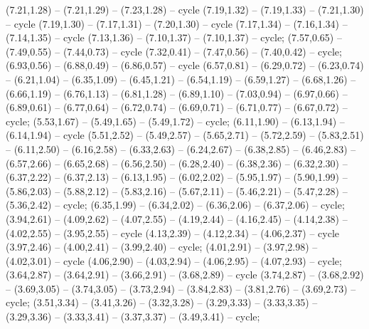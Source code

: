 { (7.21,1.28) -- (7.21,1.29) -- (7.23,1.28) -- cycle (7.19,1.32) -- (7.19,1.33) -- (7.21,1.30) -- cycle (7.19,1.30) -- (7.17,1.31) -- (7.20,1.30) -- cycle (7.17,1.34) -- (7.16,1.34) -- (7.14,1.35) -- cycle (7.13,1.36) -- (7.10,1.37) -- (7.10,1.37) -- cycle;
 (7.57,0.65) -- (7.49,0.55) -- (7.44,0.73) -- cycle (7.32,0.41) -- (7.47,0.56) -- (7.40,0.42) -- cycle;
 (6.93,0.56) -- (6.88,0.49) -- (6.86,0.57) -- cycle (6.57,0.81) -- (6.29,0.72) -- (6.23,0.74) -- (6.21,1.04) -- (6.35,1.09) -- (6.45,1.21) -- (6.54,1.19) -- (6.59,1.27) -- (6.68,1.26) -- (6.66,1.19) -- (6.76,1.13) -- (6.81,1.28) -- (6.89,1.10) -- (7.03,0.94) -- (6.97,0.66) -- (6.89,0.61) -- (6.77,0.64) -- (6.72,0.74) -- (6.69,0.71) -- (6.71,0.77) -- (6.67,0.72) -- cycle;
 (5.53,1.67) -- (5.49,1.65) -- (5.49,1.72) -- cycle;
 (6.11,1.90) -- (6.13,1.94) -- (6.14,1.94) -- cycle (5.51,2.52) -- (5.49,2.57) -- (5.65,2.71) -- (5.72,2.59) -- (5.83,2.51) -- (6.11,2.50) -- (6.16,2.58) -- (6.33,2.63) -- (6.24,2.67) -- (6.38,2.85) -- (6.46,2.83) -- (6.57,2.66) -- (6.65,2.68) -- (6.56,2.50) -- (6.28,2.40) -- (6.38,2.36) -- (6.32,2.30) -- (6.37,2.22) -- (6.37,2.13) -- (6.13,1.95) -- (6.02,2.02) -- (5.95,1.97) -- (5.90,1.99) -- (5.86,2.03) -- (5.88,2.12) -- (5.83,2.16) -- (5.67,2.11) -- (5.46,2.21) -- (5.47,2.28) -- (5.36,2.42) -- cycle;
 (6.35,1.99) -- (6.34,2.02) -- (6.36,2.06) -- (6.37,2.06) -- cycle;
 (3.94,2.61) -- (4.09,2.62) -- (4.07,2.55) -- (4.19,2.44) -- (4.16,2.45) -- (4.14,2.38) -- (4.02,2.55) -- (3.95,2.55) -- cycle (4.13,2.39) -- (4.12,2.34) -- (4.06,2.37) -- cycle (3.97,2.46) -- (4.00,2.41) -- (3.99,2.40) -- cycle;
 (4.01,2.91) -- (3.97,2.98) -- (4.02,3.01) -- cycle (4.06,2.90) -- (4.03,2.94) -- (4.06,2.95) -- (4.07,2.93) -- cycle;
 (3.64,2.87) -- (3.64,2.91) -- (3.66,2.91) -- (3.68,2.89) -- cycle (3.74,2.87) -- (3.68,2.92) -- (3.69,3.05) -- (3.74,3.05) -- (3.73,2.94) -- (3.84,2.83) -- (3.81,2.76) -- (3.69,2.73) -- cycle;
 (3.51,3.34) -- (3.41,3.26) -- (3.32,3.28) -- (3.29,3.33) -- (3.33,3.35) -- (3.29,3.36) -- (3.33,3.41) -- (3.37,3.37) -- (3.49,3.41) -- cycle;
}
